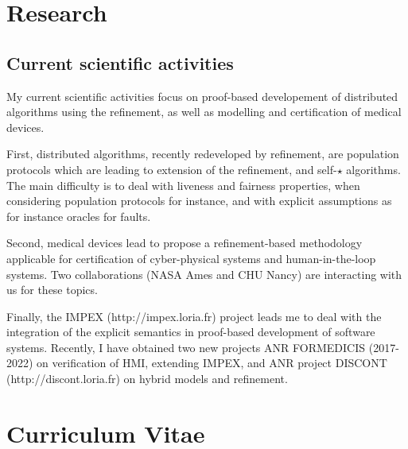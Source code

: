 \documentclass[ 12pt]{article}
\begin{document}
\section{Research}


\subsection{Current scientific activities}


  My current  scientific activities focus  on proof-based developement
  of distributed  algorithms  using    the refinement, as     well as
  modelling and certification of medical devices.

  First, distributed  algorithms,  recently redeveloped by refinement,
  are population protocols  which  are  leading  to extension  of  the
  refinement,  and self-$\star$ algorithms. The  main difficulty is to
  deal    with liveness   and   fairness properties,  when  considering
  population protocols for  instance, and with explicit assumptions as for instance 
  oracles for faults.

  Second,   medical  devices  lead  to propose a  refinement-based methodology
  applicable  for   certification    of  cyber-physical  systems   and
  human-in-the-loop  systems.  Two   collaborations (NASA Ames and  CHU
  Nancy) are interacting with us for these topics.



Finally, the IMPEX (http://impex.loria.fr) project leads me to deal with the integration of
the explicit semantics in  proof-based development of software
systems. Recently, I have obtained two new projects ANR FORMEDICIS
(2017-2022) on verification of HMI, extending IMPEX, and ANR project
DISCONT (http://discont.loria.fr)  on hybrid models and  refinement.







\section{Curriculum Vitae}
\newcommand{\nancyIesial}{\ca{Universit\'{e} de Nancy I~:~Ecole sup\'{e}rieure d'informatique appliqu\'{e}e de Lorraine}}
\newcommand{\inancyIesial}{Universit\'{e} Henri Poincar\'e -  Nancy I}
\newcommand{\nancyIesstin}{\ca{Universit\'{e} de Nancy I~(Ecole sup\'{e}rieure des sciences et technologies de l'ing\'{e}nieur de Nancy)}}
\newcommand{\inancyIesstin}{Universit\'{e} de Nancy I~(Ecole sup\'{e}rieure des sciences et technologies de l'ing\'{e}nieur de Nancy)}
\end{document}
